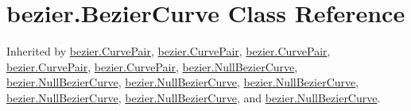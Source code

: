\hypertarget{classbezier_1_1_bezier_curve}{}\section{bezier.\+Bezier\+Curve Class Reference}
\label{classbezier_1_1_bezier_curve}


Inherited by \hyperlink{classbezier_1_1_curve_pair}{bezier.\+Curve\+Pair}, \hyperlink{classbezier_1_1_curve_pair}{bezier.\+Curve\+Pair}, \hyperlink{classbezier_1_1_curve_pair}{bezier.\+Curve\+Pair}, \hyperlink{classbezier_1_1_curve_pair}{bezier.\+Curve\+Pair}, \hyperlink{classbezier_1_1_curve_pair}{bezier.\+Curve\+Pair}, \hyperlink{classbezier_1_1_null_bezier_curve}{bezier.\+Null\+Bezier\+Curve}, \hyperlink{classbezier_1_1_null_bezier_curve}{bezier.\+Null\+Bezier\+Curve}, \hyperlink{classbezier_1_1_null_bezier_curve}{bezier.\+Null\+Bezier\+Curve}, \hyperlink{classbezier_1_1_null_bezier_curve}{bezier.\+Null\+Bezier\+Curve}, \hyperlink{classbezier_1_1_null_bezier_curve}{bezier.\+Null\+Bezier\+Curve}, \hyperlink{classbezier_1_1_null_bezier_curve}{bezier.\+Null\+Bezier\+Curve}, and \hyperlink{classbezier_1_1_null_bezier_curve}{bezier.\+Null\+Bezier\+Curve}.

